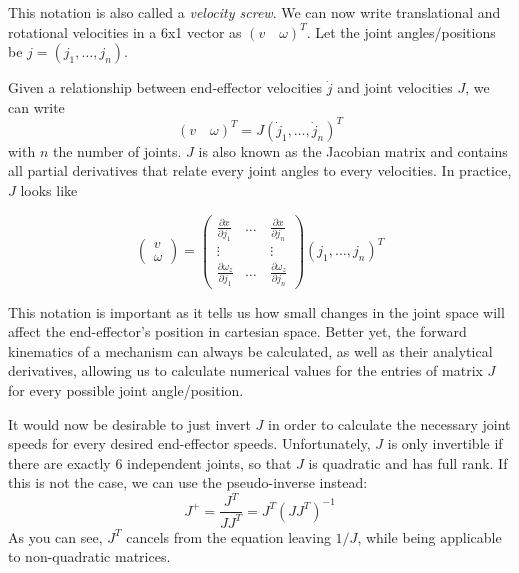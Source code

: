 This notation is also called a \emph{velocity screw}. %
We can now write translational and rotational velocities in a 6x1 vector as $ (v \quad \omega)^T$. Let the joint angles/positions be $j=(j_1, \ldots, j_n)$.

Given a relationship between end-effector velocities $\dot{j}$ and joint velocities $J$, we can write
\begin{equation}
 (v \quad \omega)^T=J(\dot{j}_1,\ldots,\dot{j}_n)^T
\end{equation}
with $ n$ the number of joints. $J$ is also known as the Jacobian matrix  and contains all partial derivatives that relate every joint angles to every velocities. In practice, $J$ looks like

\begin{equation}
\left(\begin{array}{c}v\\\omega\end{array}\right)=\left(\begin{array}{ccc}\frac{\partial{x}}{\partial{j_1}} & \ldots & \frac{\partial{x}}{\partial{j_n}}\\\vdots & \quad & \vdots\\\frac{\partial{\omega_z}}{\partial{j_1}} & \ldots & \frac{\partial{\omega_z}}{\partial{j_n}}\end{array}\right)(j_1,\ldots,j_n)^T
\end{equation}

This notation is important as it tells us how small changes in the joint space will affect the end-effector's position in cartesian space. Better yet, the forward kinematics of a mechanism can always be calculated, as well as their analytical derivatives, allowing us to calculate numerical values for the entries of matrix $J$ for every possible joint angle/position.

It would now be desirable to just invert $J$ in order to calculate the necessary joint speeds for every desired end-effector speeds. Unfortunately, $ J$ is only invertible if there are exactly 6 independent joints, so that $ J$ is quadratic and has full rank. If this is not the case, we can use the pseudo-inverse instead:
\begin{equation}
J^+=\frac{J^T}{JJ^T}=J^T(JJ^T)^{-1}
\end{equation}
As you can see, $J^T$ cancels from the equation leaving $1/J$, while being applicable to non-quadratic matrices.

